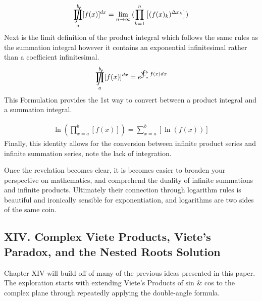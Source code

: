 \documentclass{article}
\DeclareMathOperator*{\SumInt}{%
\mathchoice%
  {\ooalign{$\displaystyle\sum$\cr\hidewidth$\displaystyle\int$\hidewidth\cr}}
  {\ooalign{\raisebox{.14\height}{\scalebox{.7}{$\textstyle\sum$}}\cr\hidewidth$\textstyle\int$\hidewidth\cr}}
  {\ooalign{\raisebox{.2\height}{\scalebox{.6}{$\scriptstyle\sum$}}\cr$\scriptstyle\int$\cr}}
  {\ooalign{\raisebox{.2\height}{\scalebox{.6}{$\scriptstyle\sum$}}\cr$\scriptstyle\int$\cr}}
}
\DeclareMathOperator*{\ProdInt}{%
\mathchoice%
  {\ooalign{$\displaystyle\prod$\cr\hidewidth$\displaystyle\int$\hidewidth\cr}}
  {\ooalign{\raisebox{.14\height}{\scalebox{.7}{$\textstyle\prod$}}\cr\hidewidth$\textstyle\int$\hidewidth\cr}}
  {\ooalign{\raisebox{.2\height}{\scalebox{.6}{$\scriptstyle\prod$}}\cr$\scriptstyle\int$\cr}}
  {\ooalign{\raisebox{.2\height}{\scalebox{.6}{$\scriptstyle\prod$}}\cr$\scriptstyle\int$\cr}}
}
\begin{document}
\begin{align*}
\ProdInt_{a}^{b} [ f(x) ]^{dx} = \lim_{n \to \infty}{(\prod_{k=1}^{n} \left[(f(x)_{k})^{\Delta x_{k}} \right])}
\end{align*}
Next is the limit definition of the product integral which follows the same rules as the summation integral however it contains an exponential infinitesimal rather than a coefficient infinitesimal.
\begin{align*}
\ProdInt_{a}^{b} [ f(x) ]^{dx} = e^{\SumInt_{a}^{b} f(x) dx}
\end{align*}
This Formulation provides the 1st way to convert between a product integral and a summation integral.

\begin{align*}
\ln(\prod_{x=a}^{b} [f(x)])= \sum_{x=a}^{b} [\ln(f(x))]
\end{align*}
Finally, this identity allows for the conversion between infinite product series and infinite summation series, note the lack of integration.

Once the revelation becomes clear, it is becomes easier to broaden your perspective on mathematics, and comprehend the duality of infinite summations and infinite products. Ultimately their connection through logarithm rules is beautiful and ironically sensible for exponentiation, and logarithms are two sides of the same coin.

\newpage
\subsection*{XIV. Complex Viete Products, Viete's Paradox, and the Nested Roots Solution}
Chapter XIV will build off of many of the previous ideas presented in this paper. The exploration starts with extending Viete's Products of sin & cos to the complex plane through repeatedly applying the double-angle formula.
\end{document}
